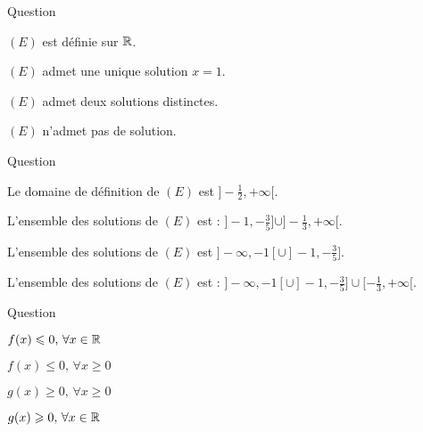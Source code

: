 \begin{multi}[multiple,feedback=
{On a : \((E) \Leftrightarrow 2^{2x}+ 2^{2x+1} = 3^{x+1}+3^x \Leftrightarrow (1+2)2^{2x}=(1+3)3^{x}  \Leftrightarrow 2^{2x-2} =3^{x-1} \Leftrightarrow (2x-2)\ln 2=(x-1) \ln 3 \Leftrightarrow  x=1\).
}]{Question}
    \item* \((E)\) est définie sur \(\mathbb{R}\).
    \item* \((E)\) admet une unique solution \(x=1\).
    \item \((E)\) admet deux solutions distinctes.
    \item \((E)\) n'admet pas de solution.
\end{multi}


\begin{multi}[multiple,feedback=
{Soit \(x \in \Rr \backslash \{-1, -\frac{1}{2}\}\). \((E) \Leftrightarrow \ln \vert \frac{x+1}{4x+2} \vert \le  0 \Leftrightarrow \, (E') : \, \vert \frac{x+1}{4x+2} \vert \le 1 \). 
Si \(x>-\frac{1}{2}\), \((E')\Leftrightarrow -4x-2 \le x+1\le 4x+2  \Leftrightarrow x \ge -\frac{1}{3}\).
Si  \(x<-\frac{1}{2}\), \((E')\Leftrightarrow -4x-2 \ge x+1 \ge 4x+2  \Leftrightarrow x \le -\frac{3}{5}\).
Par conséquent, l'ensemble des solutions de \((E)\) est \(]-\infty, -1[ \cup ]-1,-\frac{3}{5}] \cup [-\frac{1}{3}, + \infty[\). 
}]{Question}
    \item Le domaine de définition de \((E)\) est  \(]-\frac{1}{2}, +\infty[\).
    \item L'ensemble des solutions de \((E)\) est : \( ]-1,-\frac{3}{5}] \cup ]-\frac{1}{3}, + \infty[\).
    \item L'ensemble des solutions de \((E)\) est \(]-\infty, -1[ \cup ]-1,-\frac{3}{5}]  \).
    \item* L'ensemble des solutions de \((E)\) est : \(]-\infty, -1[ \cup ]-1,-\frac{3}{5}] \cup [-\frac{1}{3}, + \infty[\).
\end{multi}


\begin{multi}[multiple,feedback=
{On pourra étudier les variations des fonctions \(f\) et \(g\). On obtient :  \(\sin x \le x, \, \forall x\ge 0\) et \(e^x \ge 1+x, \, \forall x\in \Rr\).
}]{Question}
    \item \(f(x) \leqslant  0, \,  \forall x \in \mathbb{R}\)
    \item* \(f(x) \le  0, \,   \forall x\ge 0\)
    \item* \(g(x) \ge   0, \,   \forall x\ge 0\)
    \item* \(g(x) \geqslant   0, \,  \forall x \in \mathbb{R}\)
\end{multi}


